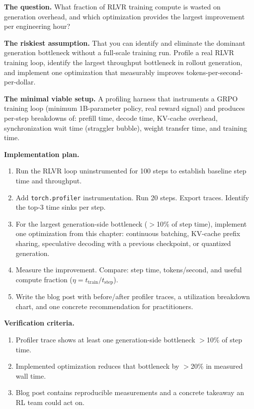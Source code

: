 \begin{portfolio}
\textbf{The question.}
What fraction of RLVR training compute is wasted on generation overhead, and which optimization provides the largest improvement per engineering hour?

\medskip
\textbf{The riskiest assumption.}
That you can identify and eliminate the dominant generation bottleneck without a full-scale training run. Profile a real RLVR training loop, identify the largest throughput bottleneck in rollout generation, and implement one optimization that measurably improves tokens-per-second-per-dollar.

\medskip
\textbf{The minimal viable setup.}
A profiling harness that instruments a GRPO training loop (minimum 1B-parameter policy, real reward signal) and produces per-step breakdowns of: prefill time, decode time, KV-cache overhead, synchronization wait time (straggler bubble), weight transfer time, and training time.

\medskip
\textbf{Implementation plan.}
\begin{enumerate}
  \item Run the RLVR loop uninstrumented for 100 steps to establish baseline step time and throughput.
  \item Add \texttt{torch.profiler} instrumentation. Run 20 steps. Export traces. Identify the top-3 time sinks per step.
  \item For the largest generation-side bottleneck ($>$10\% of step time), implement one optimization from this chapter: continuous batching, KV-cache prefix sharing, speculative decoding with a previous checkpoint, or quantized generation.
  \item Measure the improvement. Compare: step time, tokens/second, and useful compute fraction ($\eta = t_{\text{train}} / t_{\text{step}}$).
  \item Write the blog post with before/after profiler traces, a utilization breakdown chart, and one concrete recommendation for practitioners.
\end{enumerate}

\medskip
\textbf{Verification criteria.}
\begin{enumerate}
  \item Profiler trace shows at least one generation-side bottleneck $>$10\% of step time.
  \item Implemented optimization reduces that bottleneck by $>$20\% in measured wall time.
  \item Blog post contains reproducible measurements and a concrete takeaway an RL team could act on.
\end{enumerate}
\end{portfolio}

\newpage
